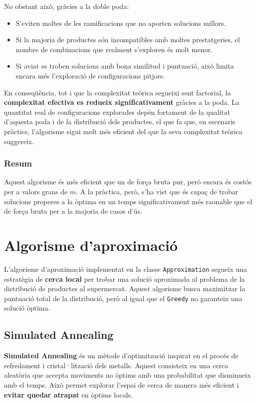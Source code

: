 \documentclass[a4paper,12pt]{report}
\begin{document}
\begin{itemize}
No obstant això, gràcies a la doble poda:
\begin{itemize}
    \item S'eviten moltes de les ramificacions que no aporten solucions millors.
    \item Si la majoria de productes són incompatibles amb moltes prestatgeries, el nombre de combinacions que realment s'exploren és molt menor.
    \item Si aviat es troben solucions amb bona similitud i puntuació, això limita encara més l'exploració de configuracions pitjors.
\end{itemize}

En conseqüència, tot i que la complexitat teòrica segueixi sent factorial, la \textbf{complexitat efectiva es redueix significativament} gràcies a la poda. La quantitat real de configuracions explorades depèn fortament de la qualitat d'aquesta poda i de la distribució dels productes, el que fa que, en escenaris pràctics, l'algorisme sigui molt més eficient del que la seva complexitat teòrica suggereix.

\subsubsection{Resum}

Aquest algorisme és més eficient que un de força bruta pur, però encara és costós per a valors grans de \(m\). A la pràctica, però, s'ha vist que és capaç de trobar solucions properes a la òptima en un temps significativament més raonable que el de força bruta per a la majoria de casos d'ús.

\section{Algorisme d'aproximació}

L'algorisme d'aproximació implementat en la classe \texttt{Approximation} segueix una estratègia de \textbf{cerca local} per trobar una solució aproximada al problema de la distribució de productes al supermercat. Aquest algorisme busca maximitzar la puntuació total de la distribució, però al igual que el \texttt{Greedy} no garanteix una solució òptima.

\subsection{Simulated Annealing}
\textbf{Simulated Annealing} és un mètode d'optimització inspirat en el procés de refredament i cristal·lització dels metalls. Aquest consisteix en una cerca aleatòria que accepta moviments no òptims amb una probabilitat que disminueix amb el temps. Això permet explorar l'espai de cerca de manera més eficient i \textbf{evitar quedar atrapat} en òptims locals.


\end{itemize}
\end{document}
